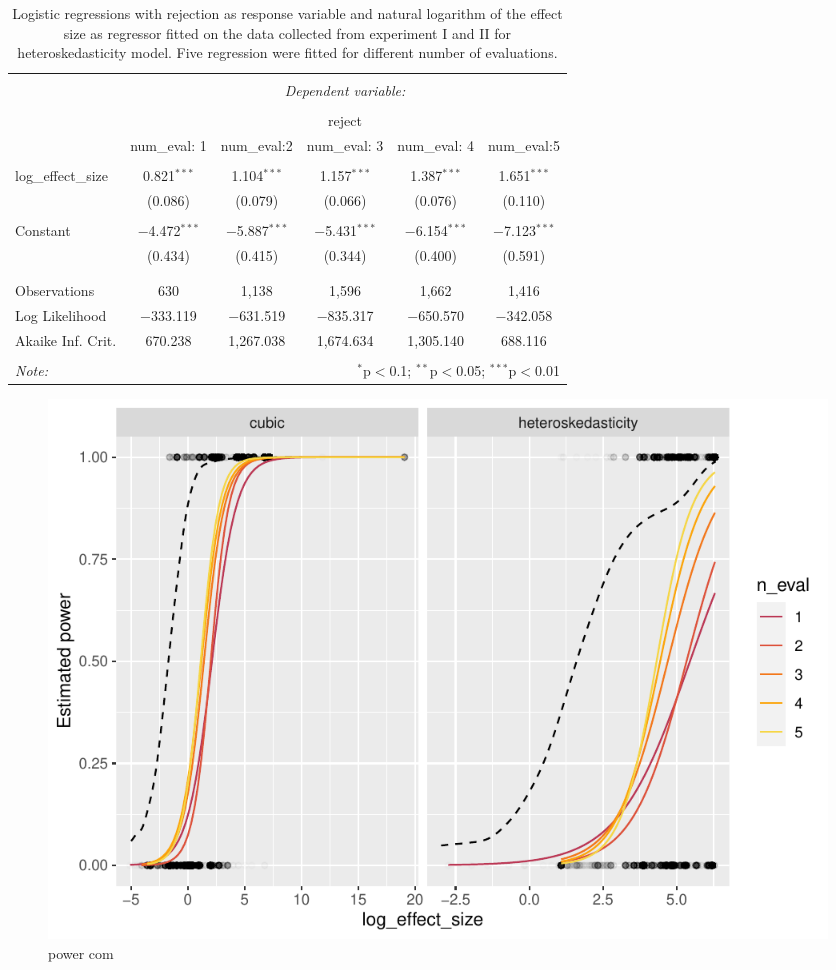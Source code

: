 \documentclass[]{interact}
\theoremstyle{plain}%
\theoremstyle{definition}
\theoremstyle{remark}
\begin{document}
\begin{table}[!htbp] \centering 
  \caption{Logistic regressions with rejection as response variable and natural logarithm of the effect size as regressor fitted on the data collected from experiment I and II for heteroskedasticity model. Five regression were fitted for different number of evaluations.} 
  \label{tab:powerglmheter} 
\begin{tabular}{@{\extracolsep{5pt}}lccccc} 
\\[-1.8ex]\hline 
\hline \\[-1.8ex] 
 & \multicolumn{5}{c}{\textit{Dependent variable:}} \\ 
\cline{2-6} 
\\[-1.8ex] & \multicolumn{5}{c}{reject} \\ 
 & num\_eval: 1 & num\_eval:2 & num\_eval: 3 & num\_eval: 4 & num\_eval:5 \\ 
\hline \\[-1.8ex] 
 log\_effect\_size & 0.821$^{***}$ & 1.104$^{***}$ & 1.157$^{***}$ & 1.387$^{***}$ & 1.651$^{***}$ \\ 
  & (0.086) & (0.079) & (0.066) & (0.076) & (0.110) \\ 
  & & & & & \\ 
 Constant & $-$4.472$^{***}$ & $-$5.887$^{***}$ & $-$5.431$^{***}$ & $-$6.154$^{***}$ & $-$7.123$^{***}$ \\ 
  & (0.434) & (0.415) & (0.344) & (0.400) & (0.591) \\ 
  & & & & & \\ 
\hline \\[-1.8ex] 
Observations & 630 & 1,138 & 1,596 & 1,662 & 1,416 \\ 
Log Likelihood & $-$333.119 & $-$631.519 & $-$835.317 & $-$650.570 & $-$342.058 \\ 
Akaike Inf. Crit. & 670.238 & 1,267.038 & 1,674.634 & 1,305.140 & 688.116 \\ 
\hline 
\hline \\[-1.8ex] 
\textit{Note:}  & \multicolumn{5}{r}{$^{*}$p$<$0.1; $^{**}$p$<$0.05; $^{***}$p$<$0.01} \\ 
\end{tabular} 
\end{table}

\begin{figure}
\centering
\includegraphics{paper_comparison_files/figure-latex/power-com-1.pdf}
\caption{\label{fig:power-com}power com}
\end{figure}



\end{document}
